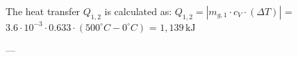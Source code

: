 The heat transfer \( Q_{1,2} \) is calculated as:  
\( Q_{1,2} = |m_{g,1} \cdot c_V \cdot (\Delta T)| \)  
= \( 3.6 \cdot 10^{-3} \cdot 0.633 \cdot (500^\circ C - 0^\circ C) \)  
= \( 1,139 \, \text{kJ} \)  

---
